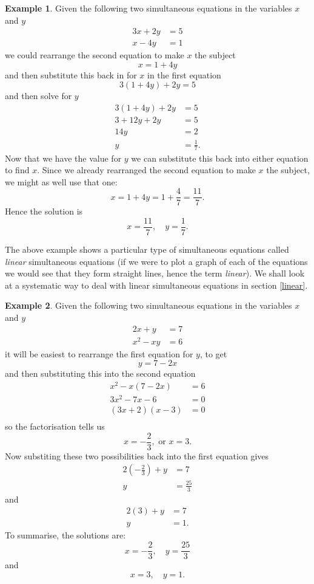\documentclass[
]{book}
\theoremstyle{definition}
\theoremstyle{definition}
\newtheorem{example}{Example}[chapter]
\theoremstyle{definition}
\theoremstyle{definition}
\theoremstyle{remark}
\begin{document}
\begin{example}
\protect\hypertarget{exm:simul-lin}{}\label{exm:simul-lin}Given the following two simultaneous equations in the variables \(x\) and \(y\)
\begin{align*}
3x+2y&=5\\
x-4y&=1
\end{align*}
we could rearrange the second equation to make \(x\) the subject
\[x=1+4y\]
and then substitute this back in for \(x\) in the first equation
\[3(1+4y)+2y=5\]
and then solve for \(y\)
\begin{align*}
3(1+4y)+2y&=5\\
3+12y+2y&=5\\
14y&=2\\
y&=\frac{1}{7}.
\end{align*}
Now that we have the value for \(y\) we can substitute this back into either equation to find \(x\). Since we already rearranged the second equation to make \(x\) the subject, we might as well use that one:
\[x=1+4y=1+\frac{4}{7}=\frac{11}{7}.\]
Hence the solution is
\[x=\frac{11}{7},\quad y=\frac{1}{7}.\]
\end{example}

The above example shows a particular type of simultaneous equations called \emph{linear} simultaneous equations (if we were to plot a graph of each of the equations we would see that they form straight lines, hence the term \emph{linear}). We shall look at a systematic way to deal with linear simultaneous equations in section \ref{linear}.

\begin{example}
\protect\hypertarget{exm:simul-nonlin}{}\label{exm:simul-nonlin}Given the following two simultaneous equations in the variables \(x\) and \(y\)
\begin{align*}
2x+y&=7\\
x^2-xy&=6
\end{align*}
it will be easiest to rearrange the first equation for \(y\), to get
\[y=7-2x\]
and then substituting this into the second equation
\begin{align*}
x^2-x(7-2x)&=6\\
3x^2-7x-6&=0\\
(3x+2)(x-3)&=0\\
\end{align*}
so the factorisation tells us
\[x=-\frac{2}{3},\text{ or } x = 3.\]
Now substiting these two possibilities back into the first equation gives
\begin{align*}
2(-\frac{2}{3})+y&=7\\
y&=\frac{25}{3}
\end{align*}
and
\begin{align*}
2(3)+y&=7\\
y&=1.
\end{align*}
To summarise, the solutions are:
\[x = -\frac{2}{3},\quad y = \frac{25}{3}\]
and
\[x=3,\quad y=1.\]
\end{example}
\end{document}
